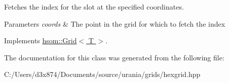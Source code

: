 \-Fetches the index for the slot at the specified coordinates. 


\begin{DoxyParams}{\-Parameters}
{\em coords} & \-The point in the grid for which to fetch the index \\
\hline
\end{DoxyParams}


\-Implements \hyperlink{classhsom_1_1_grid_a1c3162ea843ab3f7e79136425e011a5d}{hsom\-::\-Grid$<$ T $>$}.



\-The documentation for this class was generated from the following file\-:\begin{DoxyCompactItemize}
\item 
\-C\-:/\-Users/d3x874/\-Documents/source/urania/grids/hexgrid.\-hpp\end{DoxyCompactItemize}
